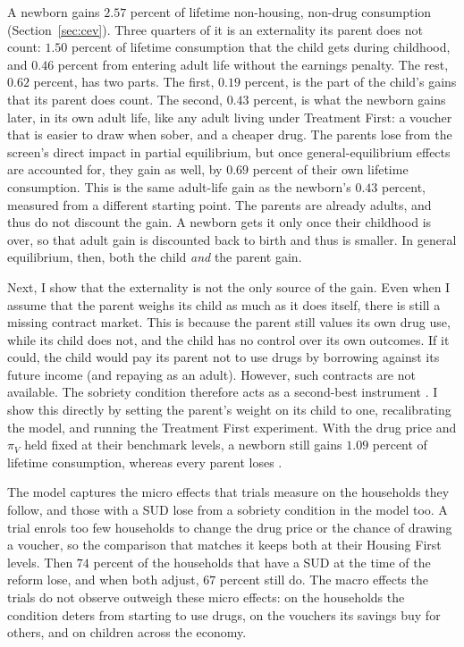 \documentclass[10pt]{article}
\newif\ifshowupdates \showupdatesfalse
\newcommand{\updnum}[1]{\ifshowupdates{\color{blue}#1}\else#1\fi}
\begin{document}
A newborn gains $2.57$ percent of lifetime non-housing, non-drug consumption (Section~\ref{sec:cev}). Three quarters of it is an externality its parent does not count: $1.50$ percent of lifetime consumption that the child gets during childhood, and $0.46$ percent from entering adult life without the earnings penalty. The rest, $0.62$ percent, has two parts. The first, $0.19$ percent, is the part of the child's gains that its parent does count. The second, $0.43$ percent, is what the newborn gains later, in its own adult life, like any adult living under Treatment First: a voucher that is easier to draw when sober, and a cheaper drug. The parents lose from the screen's direct impact in partial equilibrium, but once general-equilibrium effects are accounted for, they gain as well, by $0.69$ percent of their own lifetime consumption. This is the same adult-life gain as the newborn's $0.43$ percent, measured from a different starting point.   The parents are already adults, and thus do not discount the gain. A newborn gets it only once their childhood is over, so that adult gain is discounted back to birth and thus is smaller. In general equilibrium, then, both the child \emph{and} the parent gain.

 Next, I show that the externality  is not the only source of the gain. Even  when I assume that the parent  weighs its child as much as it does itself, there is still a missing contract market. This is because the parent still values its own drug use,  while its child does not, and the child has no control over its own outcomes.  If it could, the child would pay its parent not to  use drugs by borrowing against its future income  (and repaying as an  adult). However,  such contracts are not available. The sobriety condition therefore acts as a  second-best instrument .  I show this  directly by setting the parent's weight on its child to one,  recalibrating the model, and running the Treatment First experiment. With the drug price and $\pi_V$ held fixed at their benchmark levels, a newborn still gains $1.09$ percent of lifetime consumption,  whereas every parent loses .

The model captures the micro effects that trials measure on the households they follow, and those with a SUD lose from a sobriety condition in the model too. A trial enrols too few households to change the drug price or the chance of drawing a voucher, so the comparison that matches it keeps both at their Housing First levels. Then $74$ percent of the households that have a SUD at the time of the reform lose, and when both adjust, \updnum{$67$} percent still do. The macro effects the trials do not observe outweigh these micro effects: on the households the condition deters from starting to use drugs, on the vouchers its savings buy for others, and on children across the economy.
\end{document}

